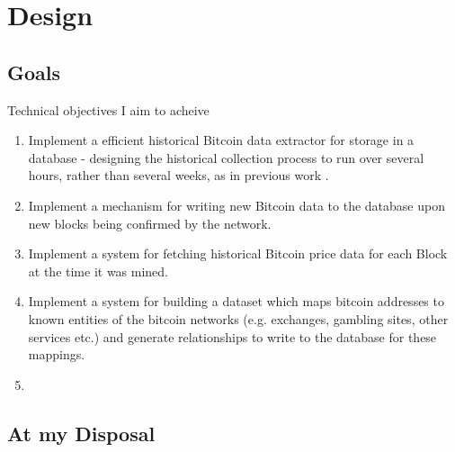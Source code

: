 \chapter{Design}

\section{Goals}
Technical objectives I aim to acheive
\begin{enumerate}
    \item Implement a efficient historical Bitcoin data extractor for storage in a database - designing the historical collection process to run over several hours, rather than several weeks, as in previous work \cite{RefWorks:doc:5c98e031e4b068320632cef2}.
    \item Implement a mechanism for writing new Bitcoin data to the database upon new blocks being confirmed by the network.
    \item Implement a system for fetching historical Bitcoin price data for each Block at the time it was mined.
    \item Implement a system for building a dataset which maps bitcoin addresses to known entities of the bitcoin networks (e.g. exchanges, gambling sites, other services etc.) and generate relationships to write to the database for these mappings.
    \item {}
\end{enumerate}

\section{At my Disposal} 

